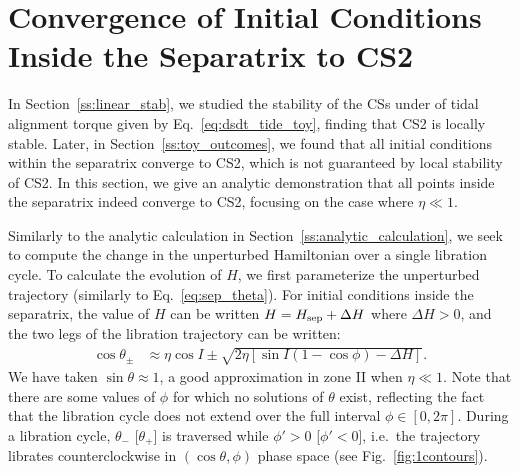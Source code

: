 \documentclass[
        fleqn,
        usenatbib,
        referee
    ]{mnras}
\newcommand*{\p}[1]{\left(#1\right)}
\newcommand*{\s}[1]{\left[#1\right]}
\begin{document}



\appendix

\onecolumn

\section{Convergence of Initial Conditions Inside the Separatrix to CS2
}\label{app:cs_stab2}

In Section~\ref{ss:linear_stab}, we studied the stability of the CSs under of
tidal alignment torque given by Eq.~\eqref{eq:dsdt_tide_toy}, finding that CS2
is locally stable. Later, in Section~\ref{ss:toy_outcomes}, we found that all
initial conditions within the separatrix converge to CS2, which is not
guaranteed by local stability of CS2. In this section, we give an analytic
demonstration that all points inside the separatrix indeed converge to CS2,
focusing on the case where $\eta \ll 1$.

Similarly to the analytic calculation in Section~\ref{ss:analytic_calculation}, we seek
to compute the change in the unperturbed Hamiltonian over a single libration
cycle. To calculate the evolution of $H$, we first parameterize the unperturbed
trajectory (similarly to Eq.~\ref{eq:sep_theta}). For initial conditions inside
the separatrix, the value of $H$ can be written $H = H_{\rm sep} + \Delta H$
where $\Delta H > 0$, and the two legs of the libration trajectory can be
written:
\begin{align}
    \cos \theta_{\pm} &\approx
        \eta \cos I \pm \sqrt{2\eta\s{\sin I\p{1 - \cos \phi} - \Delta H}}.
        \label{eq:lib_cycle_toy}
\end{align}
We have taken $\sin \theta \approx 1$, a good approximation in zone II when
$\eta \ll 1$. Note that there are some values of $\phi$ for which no solutions
of $\theta$ exist, reflecting the fact that the libration cycle does not extend
over the full interval $\phi \in [0, 2\pi]$. During a libration cycle,
$\theta_-$ [$\theta_+$] is traversed while $\phi' > 0$ [$\phi' < 0$], i.e.\ the
trajectory librates counterclockwise in $(\cos \theta, \phi)$ phase space (see
Fig.~\ref{fig:1contours}).
\end{document}
